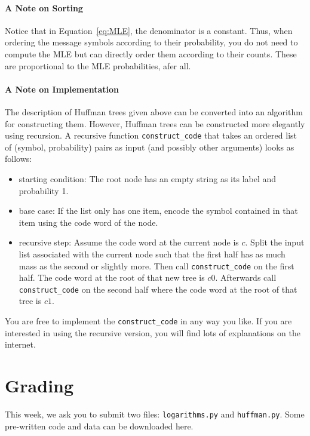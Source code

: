 \documentclass[11pt, leqno, a4paper]{article}
\begin{document}
\paragraph{A Note on Sorting} Notice that in Equation~\eqref{eq:MLE}, the denominator is a constant. Thus, when ordering the message symbols according to
their probability, you do not need to compute the MLE but can directly order them according to their counts. These are proportional to the MLE probabilities,
afer all.

\paragraph{A Note on Implementation} The description of Huffman trees given above can be converted into an algorithm for constructing them. However, Huffman trees can
be constructed more elegantly using recursion. A recursive function \texttt{construct\_code} that takes an ordered list of (symbol, probability) pairs as input (and
possibly other arguments) looks as follows:
\begin{itemize}
\item starting condition: The root node has an empty string as its label and probability 1.
\item base case: If the list only has one item, encode the symbol contained in that item using the code word of the node.
\item recursive step: Assume the code word at the current node is $ c $. Split the input list associated with the current node
such that the first half has as much mass as the second or slightly more. Then call \texttt{construct\_code} on the first half. The code word
at the root of that new tree is $ c0 $. Afterwards call \texttt{construct\_code} on the second half where the code word at the root of that tree is $ c1 $.
\end{itemize} 

You are free to implement the \texttt{construct\_code} in any way you like. If you are interested in using the recursive version, you will find lots of
explanations on the internet.

\section{Grading}
This week, we ask you to submit two files: \texttt{logarithms.py} and \texttt{huffman.py}. Some pre-written code and data can be downloaded here.
\end{document}
